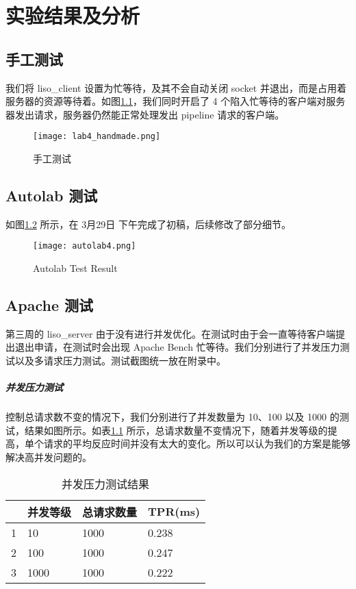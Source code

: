 

\chapter{实验结果及分析}

\section{手工测试}
我们将 liso\_client 设置为忙等待，及其不会自动关闭 socket 并退出，而是占用着服务器的资源等待着。如图\ref{fig:lab4test1}，我们同时开启了 4 个陷入忙等待的客户端对服务器发出请求，服务器仍然能正常处理发出 pipeline 请求的客户端。


\begin{figure}[htbp!]
    \centering 
    \texttt{[image: lab4\_handmade.png]}
    \caption{手工测试}
    \label{fig:lab4test1}
\end{figure}

\section{Autolab 测试} 如图\ref{fig:autolab4} 所示，在 3月29日 下午完成了初稿，后续修改了部分细节。

\begin{figure}[htbp!]
    \centering
    \texttt{[image: autolab4.png]}
    \caption{Autolab Test Result}\label{fig:autolab4}
\end{figure}

\section{Apache 测试} 

第三周的 liso\_server 由于没有进行并发优化。在测试时由于会一直等待客户端提出退出申请，在测试时会出现 Apache Bench 忙等待。我们分别进行了并发压力测试以及多请求压力测试。测试截图统一放在附录中。

\paragraph*{并发压力测试} 控制总请求数不变的情况下，我们分别进行了并发数量为 10、100 以及 1000 的测试，结果如图所示。如表\ref{tab:parallel} 所示，总请求数量不变情况下，随着并发等级的提高，单个请求的平均反应时间并没有太大的变化。所以可以认为我们的方案是能够解决高并发问题的。

\begin{table}[htbp!]
    \centering
    \begin{tabular}{llll}\hline
      & 并发等级 & 总请求数量 & TPR(ms)   \\\hline
    1 & 10   & 1000  & 0.238 \\
    2 & 100  & 1000  & 0.247 \\
    3 & 1000 & 1000  & 0.222\\
    \hline
    \end{tabular}
    \caption{并发压力测试结果}\label{tab:parallel}
\end{table}


